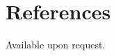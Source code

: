 \begin{minipage}[t]{0.675\textwidth}
\sectionspace %

\section{References}
Available upon request.


\end{minipage} %
\vspace*{\fill}
\center{\textcolor{gray}{2/2}}